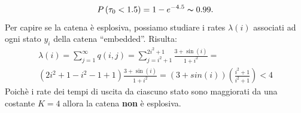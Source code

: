 \documentclass[11pt,largemargins]{homework}
\begin{document}
\begin{alphaparts}
\begin{equation*}
P\left(\tau_{0}<1.5\right)=1-e^{-4.5}\thicksim 0.99.
\end{equation*}
\questionpart
Per capire se la catena è esplosiva, possiamo studiare i rates $\lambda\left(i\right)$ associati ad ogni stato $y_{i}$ della catena ``embedded''. Risulta:
\begin{gather*}
\lambda(i) =  \sum \limits_{j=1}^{\infty} q(i,j) =  \sum \limits_{j = i^2 +1}^{2i^2 + 1} \frac{3+\sin(i)}{1+i^2} = \\
(2i^2 + 1 - i^2 - 1+1) \frac{3+\sin(i)}{1+i^2} = (3+sin(i))\left(\frac{i^2+1}{i^2+1}\right)<4
\end{gather*}
Poichè i rate dei tempi di uscita da ciascuno stato sono maggiorati da una costante \(K=4\) allora la catena \textbf{non }è esplosiva.
  \end{alphaparts}
  
  
  
  \newpage
\end{document}
